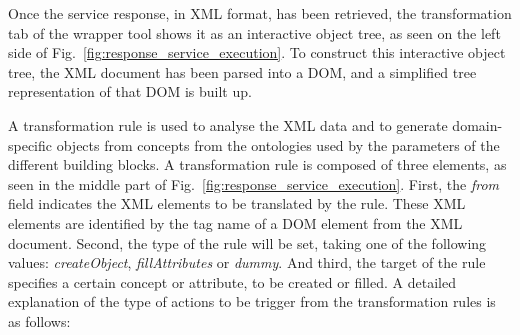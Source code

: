 Once the service response, in XML format, has been retrieved, the transformation tab of the wrapper tool shows it as an interactive object tree, as seen on the left side of Fig.~\ref{fig:response_service_execution}. To construct this interactive object tree, the XML document has been parsed into a DOM, and a simplified tree representation of that DOM is built up. 

A transformation rule is used to analyse the XML data and to generate domain-specific objects from concepts from the ontologies used by the parameters of the different building blocks. A transformation rule is composed of three elements, as seen in the middle part of Fig.~\ref{fig:response_service_execution}. First, the \textit{from} field indicates the XML elements to be translated by the rule. These XML elements are identified by the tag name of a DOM element from the XML document. Second, the type of the rule will be set, taking one of the following values: \emph{createObject}, \emph{fillAttributes} or \emph{dummy}. And third, the target of the rule specifies a certain concept or attribute, to be created or filled. A detailed explanation of the type of actions to be trigger from the transformation rules is as follows:
